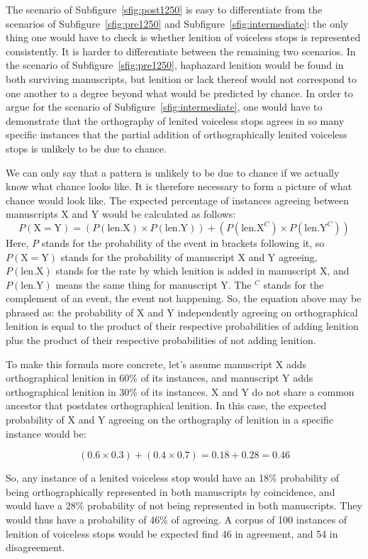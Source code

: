 The scenario of Subfigure~\ref{sfig:post1250} is easy to differentiate from the scenarios of Subfigure~\ref{sfig:pre1250} and Subfigure~\ref{sfig:intermediate}: the only thing one would have to check is whether lenition of voiceless stops is represented consistently. It is harder to differentiate between the remaining two scenarios. In the scenario of Subfigure~\ref{sfig:pre1250}, haphazard lenition would be found in both surviving manuscripts, but lenition or lack thereof would not correspond to one another to a degree beyond what would be predicted by chance. In order to argue for the scenario of Subfigure~\ref{sfig:intermediate}, one would have to demonstrate that the orthography of lenited voiceless stops agrees in so many specific instances that the partial addition of orthographically lenited voiceless stops is unlikely to be due to chance.

We can only say that a pattern is unlikely to be due to chance if we actually know what chance looks like. It is therefore necessary to form a picture of what chance would look like. The expected percentage of instances agreeing between manuscripts X and Y would be calculated as follows:
\[P(\text{X} = \text{Y}) = (P(\text{len.X}) \times P(\text{len.Y})) + (P(\text{len.X}^C) \times P(\text{len.Y}^C))\]
Here, \(P\) stands for the probability of the event in brackets following it, so \(P(\text{X}=\text{Y})\) stands for the probability of manuscript X and Y agreeing, \(P(\text{len.X})\) stands for the rate by which lenition is added in manuscript X, and \(P(\text{len.Y})\) means the same thing for manuscript Y. The \(^C\) stands for the complement of an event, \ie the event not happening. So, the equation above may be phrased as: the probability of X and Y independently agreeing on orthographical lenition is equal to the product of their respective probabilities of adding lenition plus the product of their respective probabilities of not adding lenition.

To make this formula more concrete, let's assume manuscript X adds orthographical lenition in 60\% of its instances, and manuscript Y adds orthographical lenition in 30\% of its instances. X and Y do not share a common ancestor that postdates orthographical lenition. In this case, the expected probability of X and Y agreeing on the orthography of lenition in a specific instance would be:

\[(0.6 \times 0.3) + (0.4 \times 0.7) = 0.18 + 0.28 = 0.46\]

So, any instance of a lenited voiceless stop would have an 18\% probability of being orthographically represented in both manuscripts by coincidence, and would have a 28\% probability of not being represented in both manuscripts. They would thus have a probability of 46\% of agreeing. A corpus of 100 instances of lenition of voiceless stops would be expected find 46 in agreement, and 54 in disagreement.

